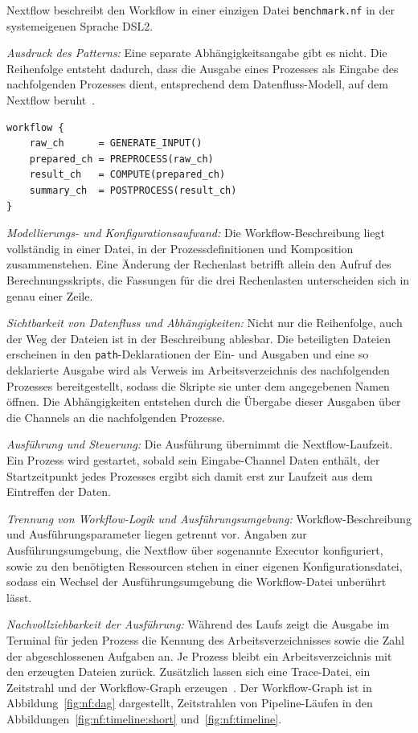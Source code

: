 Nextflow beschreibt den Workflow in einer einzigen Datei
\texttt{benchmark.nf} in der systemeigenen Sprache DSL2.

\emph{Ausdruck des Patterns:} Eine separate Abhängigkeitsangabe gibt
es nicht. Die Reihenfolge entsteht dadurch, dass die Ausgabe eines
Prozesses als Eingabe des nachfolgenden Prozesses dient, entsprechend
dem Datenfluss-Modell, auf dem Nextflow
beruht~\cite[S.~317]{ditommaso2017nextflow}.

\begin{lstlisting}[caption={workflow-Block aus benchmark.nf (Nextflow, Pipeline)},label={lst:pipe:nf}]
workflow {
    raw_ch      = GENERATE_INPUT()
    prepared_ch = PREPROCESS(raw_ch)
    result_ch   = COMPUTE(prepared_ch)
    summary_ch  = POSTPROCESS(result_ch)
}
\end{lstlisting}

\emph{Modellierungs- und Konfigurationsaufwand:} Die
Workflow-Beschreibung liegt vollständig in einer Datei, in der
Prozessdefinitionen und Komposition zusammenstehen. Eine Änderung der
Rechenlast betrifft allein den Aufruf des Berechnungsskripts, die
Fassungen für die drei Rechenlasten unterscheiden sich in genau einer
Zeile.

\emph{Sichtbarkeit von Datenfluss und Abhängigkeiten:} Nicht nur die
Reihenfolge, auch der Weg der Dateien ist in der Beschreibung
ablesbar. Die beteiligten Dateien erscheinen in den
\texttt{path}-Deklarationen der Ein- und Ausgaben und eine so
deklarierte Ausgabe wird als Verweis im Arbeitsverzeichnis des
nachfolgenden Prozesses bereitgestellt, sodass die Skripte sie unter
dem angegebenen Namen öffnen. Die Abhängigkeiten entstehen durch die
Übergabe dieser Ausgaben über die Channels an die nachfolgenden
Prozesse.

\emph{Ausführung und Steuerung:} Die Ausführung übernimmt die
Nextflow-Laufzeit. Ein Prozess wird gestartet, sobald sein
Eingabe-Channel Daten enthält, der Startzeitpunkt jedes Prozesses ergibt sich damit erst zur Laufzeit aus dem Eintreffen der Daten.

\emph{Trennung von Workflow-Logik und Ausführungsumgebung:}
Workflow-Beschreibung und Ausführungsparameter liegen getrennt vor.
Angaben zur Ausführungsumgebung, die Nextflow über sogenannte
Executor konfiguriert, sowie zu den benötigten Ressourcen stehen in
einer eigenen Konfigurationsdatei, sodass ein Wechsel der
Ausführungsumgebung die Workflow-Datei unberührt lässt.


\emph{Nachvollziehbarkeit der Ausführung:} Während des Laufs zeigt die
Ausgabe im Terminal für jeden Prozess die Kennung des
Arbeitsverzeichnisses sowie die Zahl der abgeschlossenen Aufgaben an.
Je Prozess bleibt ein Arbeitsverzeichnis mit den erzeugten Dateien
zurück. Zusätzlich lassen sich eine Trace-Datei, ein Zeitstrahl und
der Workflow-Graph erzeugen~\cite{nextflowdocs-reports}. Der Workflow-Graph ist in
Abbildung~\ref{fig:nf:dag} dargestellt, Zeitstrahlen von
Pipeline-Läufen in den Abbildungen~\ref{fig:nf:timeline:short}
und~\ref{fig:nf:timeline}.

